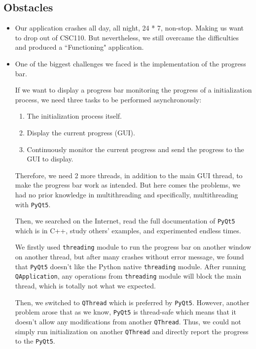 \documentclass[fontsize=11pt]{article}
\begin{document}
    \subsection{Obstacles}

    \begin{itemize}
        \item Our application crashes all day, all night, 24 * 7, non-stop. Making us want to drop out of CSC110. But nevertheless, we still overcame the difficulties and produced a ``Functioning" application.
        \item One of the biggest challenges we faced is the implementation of the progress bar.
        
        If we want to display a progress bar monitoring the progress of a initialization process, we need three tasks to be performed asynchronously:
        \begin{enumerate}
            \item The initialization process itself.
            \item Display the current progress (GUI).
            \item Continuously monitor the current progress and send the progress to the GUI to display.
        \end{enumerate}

        Therefore, we need 2 more threads, in addition to the main GUI thread, to make the progress bar work as intended. But here comes the problems, we had no prior knowledge in multithreading and specifically, multithreading with \verb|PyQt5|. 

        Then, we searched on the Internet, read the full documentation of \verb|PyQt5| which is in C++, study others' examples, and experimented endless times.
        
        We firstly used \verb|threading| module to run the progress bar on another window on another thread, but after many crashes without error message, we found that \verb|PyQt5| doesn't like the Python native \verb|threading| module. After running \verb|QApplication|, any operations from \verb|threading| module will block the main thread, which is totally not what we expected.

        Then, we switched to \verb|QThread| which is preferred by \verb|PyQt5|. However, another problem arose that as we know, \verb|PyQt5| is thread-safe which means that it doesn't allow any modifications from another \verb|QThread|. Thus, we could not simply run initialization on another \verb|QThread| and directly report the progress to the \verb|PyQt5|.


\end{itemize}
\end{document}
